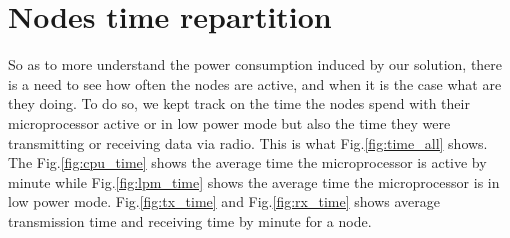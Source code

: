 \section{Nodes time repartition}

So as to more understand the power consumption induced by our solution, there is a need to see how often the nodes are active, and when it is the case what are they doing. To do so, we kept track on the time the nodes spend with their microprocessor active or in low power mode but also the time they were transmitting or receiving data via radio. This is what Fig.\ref{fig:time_all} shows. The Fig.\ref{fig:cpu_time} shows the average time the microprocessor is active by minute while Fig.\ref{fig:lpm_time} shows the average time the microprocessor is in low power mode. Fig.\ref{fig:tx_time} and Fig.\ref{fig:rx_time} shows average transmission time and receiving time by minute for a node. \\

